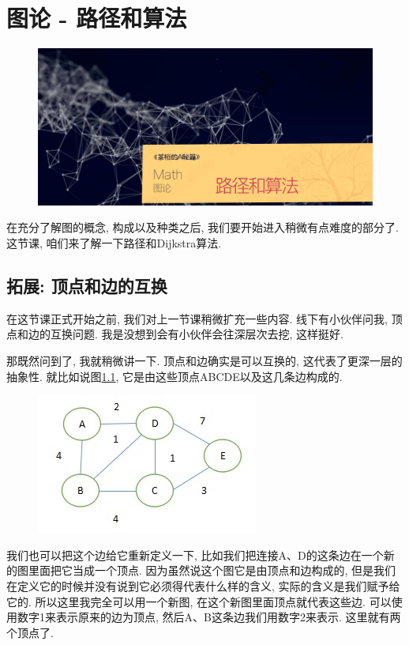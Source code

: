 \chapter{图论 - 路径和算法}

\begin{figure}[ht]
  \centering
  \includegraphics[width=1\linewidth]{asset/茶桁的AI秘籍_Math_25.png}
\end{figure}

\newpage

在充分了解图的概念, 构成以及种类之后, 我们要开始进入稍微有点难度的部分了. 这节课, 咱们来了解一下路径和Dijkstra算法. 

\section{拓展: 顶点和边的互换}

在这节课正式开始之前, 我们对上一节课稍微扩充一些内容. 线下有小伙伴问我, 顶点和边的互换问题. 我是没想到会有小伙伴会往深层次去挖, 这样挺好. 

那既然问到了, 我就稍微讲一下. 顶点和边确实是可以互换的, 这代表了更深一层的抽象性. 就比如说图\ref{fig:img26_1}, 它是由这些顶点ABCDE以及这几条边构成的. 

\begin{figure}[ht]
  \centering
  \includegraphics[width=0.5\linewidth]{asset/20230924051221.jpg}
  \caption{}
  \label{fig:img26_1}
\end{figure}

我们也可以把这个边给它重新定义一下, 比如我们把连接A、D的这条边在一个新的图里面把它当成一个顶点. 因为虽然说这个图它是由顶点和边构成的, 但是我们在定义它的时候并没有说到它必须得代表什么样的含义, 实际的含义是我们赋予给它的. 所以这里我完全可以用一个新图, 在这个新图里面顶点就代表这些边. 
可以使用数字1来表示原来的边为顶点, 然后A、B这条边我们用数字2来表示. 这里就有两个顶点了. 

